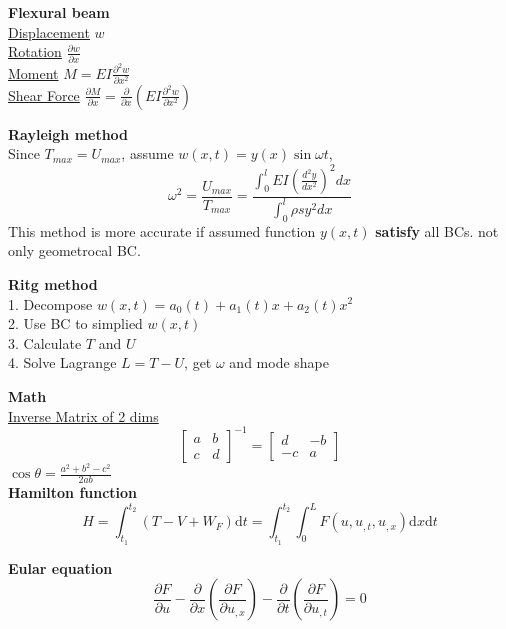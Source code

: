 \documentclass{article}
\begin{document}
\begin{multicols*}{3}
  \noindent\textbf{Flexural beam}\\
  \underline{Displacement} $w$\\
  \underline{Rotation} $\frac{\partial w}{\partial x}$\\
  \underline{Moment} $M=EI\frac{\partial^{2} w}{\partial x^{2}}$\\
  \underline{Shear Force} $\frac{\partial M}{\partial x}=\frac{\partial }{\partial x}(EI \frac{\partial^{2}w}{\partial x^{2}})$

  \noindent\textbf{Rayleigh method}\\
  Since $T_{max} = U_{max}$, assume $w(x,t) = y(x) \sin\omega t$,
      \begin{equation*}
        \omega^2 =\frac{U_{max}}{T_{max}}=\frac{\int_0^l EI(\frac{d^2y}{dx^2})^2 dx}{\int_0^l \rho s y^2 dx}
      \end{equation*}
  This method is more accurate if assumed function $y(x,t)$ \textbf{satisfy} all BCs. not only geometrocal BC.

  \noindent\textbf{Ritg method}\\
  1. Decompose $w(x,t) = a_0(t) + a_1(t)x + a_2(t)x^2$\\
  2. Use BC to simplied $w(x,t)$ \\
  3. Calculate $T$ and $U$\\
  4. Solve Lagrange $L = T - U$, get $\omega$ and mode shape

  \noindent\textbf{Math}\\
  \underline{Inverse Matrix of 2 dims}
  \begin{equation*}
    \begin{bmatrix}
      a & b \\
      c & d
    \end{bmatrix}^{-1} =
    \begin{bmatrix}
      d & -b \\
      -c & a
    \end{bmatrix}
  \end{equation*}
  $\cos\theta = \frac{a^2+b^2-c^2}{2ab}$\\

  \noindent\textbf{Hamilton function}
  \begin{equation*}
    H=\int_{t_{1}}^{t_{2}}(T-V+W_{F})\text{d}t
    =\int_{t_{1}}^{t_{2}}\int_{0}^{L}F(u,u_{,t},u_{,x})\text{d}x\text{d}t
  \end{equation*}

  \noindent\textbf{Eular equation}
  \begin{equation*}
    \frac{\partial F}{\partial u}-\frac{\partial}{\partial x}(\frac{\partial F}{\partial u_{,x}})-\frac{\partial}{\partial t}(\frac{\partial F}{\partial u_{,t}})=0
  \end{equation*}


\end{multicols*}
\end{document}
